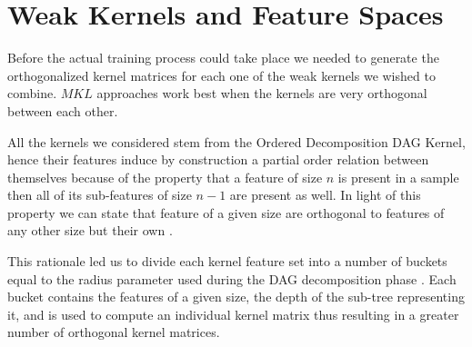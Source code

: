 

\section{Weak Kernels and Feature Spaces}
\label{subsec:features}

Before the actual training process could take place we needed to generate the
orthogonalized kernel matrices for each one of the weak kernels we wished to
combine.
$MKL$ approaches work best when the kernels are very orthogonal between each other.

All the kernels we considered stem from the Ordered Decomposition DAG Kernel,
hence their features induce by construction a partial order relation between
themselves because of the property that a feature of size $n$ is present in a 
sample then all of its sub-features of size $n-1$ are present as well.
In light of this property we can state that feature of a given size are
orthogonal to features of any other size but their own \cite{gmkl}.

This rationale led us to divide each kernel feature set into a number of buckets
equal to the radius parameter used during the DAG decomposition phase \cite{gmkl}.
Each bucket contains the features of a given size, the depth of the sub-tree
representing it, and is used to compute an individual kernel matrix thus
resulting in a greater number of orthogonal kernel matrices.


